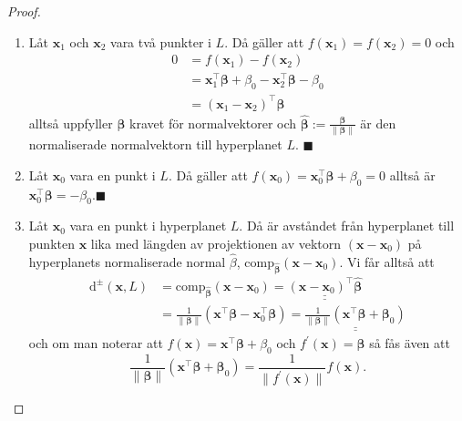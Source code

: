 \documentclass[a4paper, 12pt]{report}
\theoremstyle{definition}
\theoremstyle{remark}
\newcommand{\bfbeta}{{\boldsymbol{\beta}}}
\renewcommand\qedsymbol{$\blacksquare$}
\begin{document}
\begin{proof}
	\leavevmode
\begin{enumerate}
	\item Låt $\mathbf{x}_1$ och $\mathbf{x}_2$ vara två punkter i $L$. Då gäller att $f(\mathbf{x}_1)=f(\mathbf{x}_2)=0$ och
	\begin{align*}
		0 &= f(\mathbf{x}_1)-f(\mathbf{x}_2)\\
		&= \mathbf{x}_1^\intercal \bfbeta + \beta_0 - \mathbf{x}_2^ \intercal \bfbeta - \beta_0\\
		&= (\mathbf{x}_1-\mathbf{x}_2)^\intercal \bfbeta
	\end{align*}
	alltså uppfyller $\bfbeta$ kravet för normalvektorer och $\widehat{\bfbeta}:=\frac{\bfbeta}{\|\bfbeta\|}$ är den normaliserade normalvektorn till hyperplanet $L$. \hfill\qedsymbol
	\item Låt $\mathbf{x}_0$ vara en punkt i $L$. Då gäller att $f(\mathbf{x}_0)=\mathbf{x}_0^\intercal \bfbeta + \beta_0 = 0$ alltså är $\mathbf{x}^\intercal_0 \bfbeta = - \beta_0$.\hfill \qedsymbol
	\item Låt $\mathbf{x}_0$ vara en punkt i hyperplanet $L$. Då är avståndet från hyperplanet till punkten $\mathbf{x}$ lika med längden av projektionen av vektorn $(\mathbf{x}-\mathbf{x}_0)$ på hyperplanets normaliserade normal $\widehat{\beta}$, $\operatorname{comp_{\widehat{\bfbeta}}} ( \mathbf{x} - \mathbf{x}_0 )$. Vi får alltså att
	\begin{align*}
		\operatorname{d^\pm} ( \mathbf{x}, L ) &= \operatorname{comp_{\widehat{\bfbeta}}} ( \mathbf{x} - \mathbf{x}_0 )
		=\underline{\underline{ (\mathbf{x} - \mathbf{x}_0)^\intercal \widehat{\bfbeta} }}\\
		&= \frac{1}{\|\bfbeta\|}(\mathbf{x}^\intercal\bfbeta - \mathbf{x}_0^\intercal\bfbeta)=\underline{\underline{\frac{1}{\|\bfbeta\|}(\mathbf{x}^\intercal\bfbeta + \bfbeta_0)}}
	\end{align*}
	och om man noterar att $f(\mathbf{x})=\mathbf{x}^\intercal\bfbeta+\beta_0$ och $f^\prime(\mathbf{x})=\bfbeta$ så fås även att
	\begin{equation*}
		\frac{1}{\|\bfbeta\|}(\mathbf{x}^\intercal\bfbeta + \bfbeta_0)=\frac{1}{\|f^\prime(\mathbf{x})\|}f(\mathbf{x}).
	\end{equation*}
	\qedhere
\end{enumerate}
\end{proof}
\end{document}

